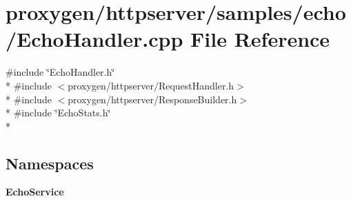 \section{proxygen/httpserver/samples/echo/\+Echo\+Handler.cpp File Reference}
\label{EchoHandler_8cpp}
{\ttfamily \#include \char`\"{}Echo\+Handler.\+h\char`\"{}}\\*
{\ttfamily \#include $<$proxygen/httpserver/\+Request\+Handler.\+h$>$}\\*
{\ttfamily \#include $<$proxygen/httpserver/\+Response\+Builder.\+h$>$}\\*
{\ttfamily \#include \char`\"{}Echo\+Stats.\+h\char`\"{}}\\*
\subsection*{Namespaces}
\begin{DoxyCompactItemize}
\item 
 {\bf Echo\+Service}
\end{DoxyCompactItemize}
